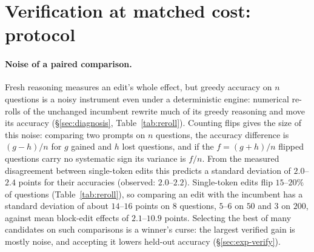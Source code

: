 \section{Verification at matched cost: protocol}
\label{app:verify}

\paragraph{Noise of a paired comparison.}\label{app:noise} Fresh reasoning measures an edit's whole
effect, but greedy accuracy on $n$ questions is a noisy instrument even under a deterministic
engine: numerical re-rolls of the unchanged incumbent rewrite much of its greedy reasoning and move
its accuracy (\S\ref{sec:diagnosis}, Table~\ref{tab:reroll}). Counting flips gives the size of this
noise: comparing two prompts on $n$ questions, the accuracy difference is $(g-h)/n$ for $g$ gained
and $h$ lost questions, and if the $f=(g+h)/n$ flipped questions carry no systematic sign its
variance is $f/n$. From the measured disagreement between single-token edits this predicts a
standard deviation of $2.0$--$2.4$ points for their accuracies (observed: $2.0$--$2.2$).
Single-token edits flip $15$--$20\%$ of questions (Table~\ref{tab:reroll}), so comparing an edit
with the incumbent has a standard deviation of about $14$--$16$ points on $8$ questions, $5$--$6$ on
$50$ and $3$ on $200$, against mean block-edit effects of $2.1$--$10.9$ points. Selecting the best
of many candidates on such comparisons is a winner's curse: the largest verified gain is mostly
noise, and accepting it lowers held-out accuracy (\S\ref{sec:exp-verify}).

